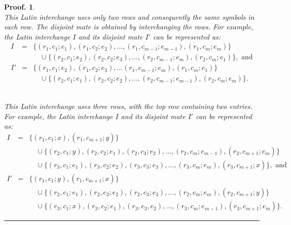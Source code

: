 \documentclass[12pt]{report}
\newtheorem{preproof}{{\bf Proof.}}
\newenvironment{proof}[1]{\begin{preproof}{\rm
               #1}\hfill{\rule[-0.5mm]{2mm}{2mm}}}{\end{preproof}}
\begin{document}
\begin{proof}
{\vspace{.2cm}

 \\
This Latin interchange uses only two rows and consequently
the same symbols in each row.
The disjoint mate is obtained by interchanging the rows.
For example, the Latin interchange $I$ and its disjoint mate $I'$ can be
represented as:
\begin{eqnarray*}
I & = & \{ ( r_{1}, c_{1}; e_{1} ), (r_{1}, c_{2}; e_{2} ), ..., (r_{1}, c_{m-1}; e_{m-1}), (r_{1}, c_{m}; e_{m} ) \} \\
&& \quad{}\cup \{ ( r_{2}, c_{1}; e_{2} ), (r_{2}, c_{2}; e_{3} ), ..., (r_{2}, c_{m-1}; e_{m}), (r_{2}, c_{m}; e_{1} ) \}, \mbox{ and} \\
I' & = & \{ ( r_{1}, c_{1}; e_{2} ), (r_{1}, c_{2}; e_{3} ), ... (r_{1}, c_{m-1}; e_{m}), (r_{1}, c_{m}; e_{1} ) \} \\
&& \quad{}\cup \{ ( r_{2}, c_{1}; e_{1} ), (r_{2}, c_{2}; e_{2} ), ..., (r_{2}, c_{m-1}; e_{m-1}), (r_{2}, c_{m}; e_{m}) \}.
\end{eqnarray*}

\noindent {\bf Variety 2} \\
This Latin interchange uses three rows, with the top row containing 
two entries.
For example, the Latin interchange $I$ and its disjoint mate $I'$ 
can be represented as: 
\begin{eqnarray*}
I & = & \{ (r_{1}, c_{1}; x ), (r_{1}, c_{m+1}; y) \} \\
&& \quad{}\cup \{ ( r_{2}, c_{1}; y ), (r_{2}, c_{2}; e_{1} ), (r_{2}, c_{3}; e_{2} ),  ..., (r_{2}, c_{m}; e_{m-1}), (r_{2}, c_{m+1}; e_{m} ) \} \\
&& \quad{}\cup \{ ( r_{3}, c_{1}; e_{1} ), (r_{3}, c_{2}; e_{2} ), (r_{3}, c_{3}; e_{3} ), ..., (r_{3}, c_{m}; e_{m}), (r_{3}, c_{m+1}; x ) \}, \mbox{ and} \\
I' & = & \{ (r_{1}, c_{1}; y ), (r_{1}, c_{m+1}; x) \} \\
&& \quad{}\cup \{ ( r_{2}, c_{1}; e_{1} ), (r_{2}, c_{2}; e_{2} ), (r_{2}, c_{3}; e_{3} ),  ..., (r_{2}, c_{m}; e_{m}), (r_{2}, c_{m+1}; y ) \} \\
&& \quad{}\cup \{ ( r_{3}, c_{1}; x ), (r_{3}, c_{2}; e_{1} ), (r_{3}, c_{3}, e_{2} ), ..., (r_{3}, c_{m}; e_{m-1}), (r_{3}, c_{m+1}; e_{m} ) \}.
\end{eqnarray*}

}
\end{proof}
\end{document}
